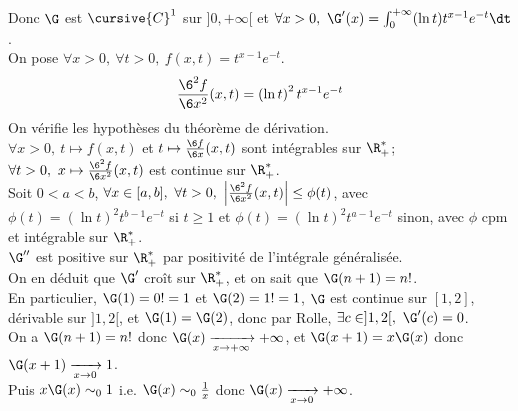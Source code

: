\documentclass[11pt]{article}
\begin{document}
\begin{ex}{}{}
    Donc $\G$ est $\cursive{C}^1$ sur $]0,+\infty[$ et $\forall x > 0, ~ \G'(x)=\int_0^{+\infty}(\ln t)t^{x-1}e^{-t}\dt$.\\
     On pose $\forall x>0, ~ \forall t > 0, ~ f(x,t)=t^{x-1}e^{-t}$.
    \begin{equation*}
        \frac{\6^2 f}{\6 x^2}(x,t)=\left( \ln t \right)^2 t^{x-1} e^{-t}
    \end{equation*}
    On vérifie les hypothèses du théorème de dérivation.\\
    $\forall x > 0, ~ t\mapsto f(x,t)$ et $t\mapsto\frac{\6 f}{\6 x}(x,t)$ sont intégrables sur $\R_+^*$; $\forall t > 0, ~ x\mapsto\frac{\6^2 f}{\6 x^2}(x,t)$ est continue sur $\R_+^*$.\\
    Soit $0<a<b$, $\forall x \in [a,b], ~ \forall t > 0, ~ \left|\frac{\6^2 f}{\6 x^2}(x,t)\right| \leq \phi(t)$, avec $\phi(t)=(\ln t)^2 t^{b-1}e^{-t}$ si $t\geq 1$ et $\phi(t)=(\ln t)^2t^{a-1}e^{-t}$ sinon, avec $\phi$ cpm et intégrable sur $\R_+^*$.\\
     $\G''$ est positive sur $\R_+^*$ par positivité de l'intégrale généralisée.\\
    On en déduit que $\G'$ croît sur $\R_+^*$, et on sait que $\G(n+1)=n!$.\\
    En particulier, $\G(1)=0!=1$ et $\G(2)=1!=1$, $\G$ est continue sur $[1,2]$, dérivable sur $]1,2[$, et $\G(1)=\G(2)$, donc par Rolle, $\exists c \in ]1,2[, ~ \G'(c)=0$.\\
    On a $\G(n+1)=n!$ donc $\G(x)\xrightarrow[x\to+\infty]{}+\infty$, et $\G(x+1)=x\G(x)$ donc $\G(x+1)\xrightarrow[x\to0]{}1$.\\
    Puis $x\G(x)\sim_01$ i.e. $\G(x)\sim_0\frac{1}{x}$ donc $\G(x)\xrightarrow[x\to0]{}+\infty$.
\end{ex}

\pagebreak
\end{document}
